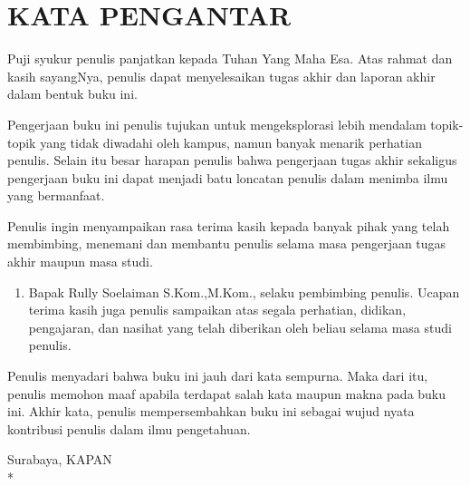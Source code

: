 \chapter {KATA PENGANTAR}

Puji syukur penulis panjatkan kepada Tuhan Yang Maha Esa. Atas rahmat dan kasih sayangNya, penulis dapat menyelesaikan tugas akhir dan laporan akhir dalam bentuk buku ini.

Pengerjaan buku ini penulis tujukan untuk mengeksplorasi lebih mendalam topik-topik yang tidak diwadahi oleh kampus, namun banyak menarik perhatian penulis. Selain itu besar harapan penulis bahwa pengerjaan tugas akhir sekaligus pengerjaan buku ini dapat menjadi batu loncatan penulis dalam menimba ilmu yang bermanfaat.

Penulis ingin menyampaikan rasa terima kasih kepada banyak pihak yang telah membimbing, menemani dan membantu penulis selama masa pengerjaan tugas akhir maupun masa studi.

\begin {enumerate}
	\item Bapak Rully Soelaiman S.Kom.,M.Kom., selaku pembimbing penulis. Ucapan terima kasih juga penulis sampaikan atas segala perhatian, didikan, pengajaran, dan nasihat yang telah diberikan oleh beliau selama masa studi penulis.
\end {enumerate}

Penulis menyadari bahwa buku ini jauh dari kata sempurna. Maka dari itu, penulis memohon maaf apabila terdapat salah kata maupun makna pada buku ini. Akhir kata, penulis mempersembahkan buku ini sebagai wujud nyata kontribusi penulis dalam ilmu pengetahuan.

\begin{flushright}
Surabaya, KAPAN \\*
\vspace{5em}
\penulis
\end{flushright}